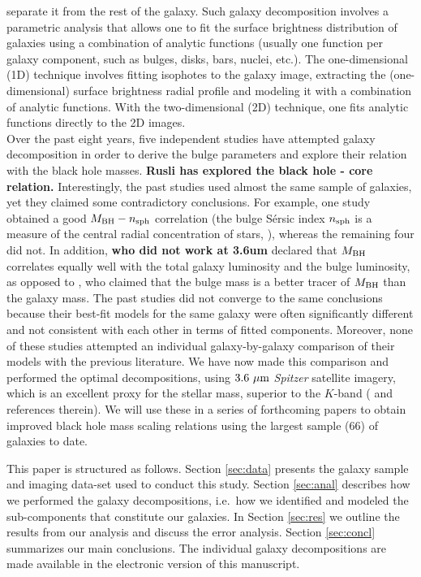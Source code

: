 \documentclass[preprint2]{emulateapj}
\begin{document}
separate it from the rest of the galaxy. 
Such galaxy decomposition involves a parametric analysis that allows one to fit the surface brightness distribution
of galaxies using a combination of analytic functions (usually one function per
galaxy component, such as bulges, disks, bars, nuclei, etc.).
The one-dimensional (1D) technique involves fitting isophotes to the galaxy image, extracting the (one-dimensional) surface 
brightness radial profile and modeling it with a combination of analytic functions.
With the two-dimensional (2D) technique, one fits analytic functions directly to the 2D images. \\
Over the past eight years, five independent studies 
\citep{grahamdriver2007,sani2011,vika2012,beifiori2012,lasker2014data,lasker2014anal} have attempted galaxy decomposition
in order to derive the bulge parameters and explore their relation with the black hole masses. 
{\bf Rusli has explored the black hole - core relation.}
Interestingly, the past studies used almost the same sample of galaxies, yet they claimed some contradictory conclusions.
For example, one study \citep{grahamdriver2007} obtained a good $M_{\rm BH}-n_{\rm sph}$ correlation
(the bulge S\'ersic index $n_{\rm sph}$ is a measure of the central radial concentration of stars, \citealt{trujillo2001}), 
whereas the remaining four did not.
In addition, \cite{lasker2014anal} {\bf who did not work at 3.6um} 
declared that $M_{\rm BH}$ correlates equally well with the total galaxy luminosity and the bulge luminosity, 
as opposed to \cite{beifiori2012}, who claimed that the bulge mass is a better tracer of $M_{\rm BH}$ than the galaxy mass.
The past studies did not converge to the same conclusions 
because their best-fit models for the same galaxy were often 
significantly different and not consistent with each other in terms of fitted components. 
Moreover, none of these studies attempted an individual galaxy-by-galaxy 
comparison of their models with the previous literature. 
We have now made this comparison and performed the optimal decompositions,
using $3.6~\rm \mu m$ \emph{Spitzer} satellite imagery, 
which is an excellent proxy for the stellar mass, superior to the $K$-band (\citealt{sheth2010} and references therein).
We will use these in a series of forthcoming papers to obtain improved black hole mass scaling relations 
using the largest sample (66) of galaxies to date.

This paper is structured as follows.
Section \ref{sec:data} presents the galaxy sample and imaging data-set used to conduct this study. 
Section \ref{sec:anal} describes how we performed the galaxy decompositions, 
i.e.~how we identified and modeled the sub-components that constitute our galaxies. 
In Section \ref{sec:res} we outline the results from our analysis and discuss the error analysis. 
Section \ref{sec:concl} summarizes our main conclusions. 
The individual galaxy decompositions are made available in the electronic version of this manuscript.
\end{document}

